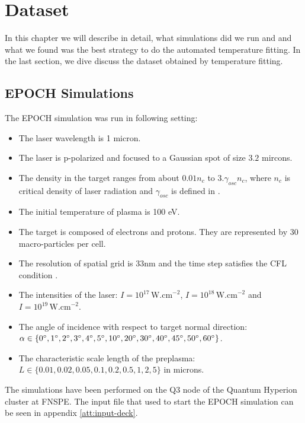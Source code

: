 \chapter{Dataset}
In this chapter we will describe in detail, what simulations did we run and and what we found was the best strategy to do the automated temperature fitting. In the last section, we dive discuss the dataset obtained by temperature fitting.
\section{EPOCH Simulations}
The EPOCH simulation was run in following setting:
\begin{itemize}
	\item The laser wavelength is 1 micron.
	\item The laser is p-polarized and focused to a Gaussian spot of size $3.2$ mircons.
	\item The density in the target ranges from about $0.01n_c$ to $3.\gamma_{osc}n_c$, where $n_c$ is critical density of laser radiation \cite{cui2013} and $\gamma_{osc}$ is defined in \cite{cui2013}.
	\item The initial temperature of plasma is 100 eV.
	\item The target is composed of electrons and protons. They are represented by 30 macro-particles per cell.
	\item The resolution of spatial grid is 33nm and the time step satisfies the CFL condition \cite{arber2015}.
	\item The intensities of the laser: $I=10^{17}\,\mathrm{W.cm}^{-2}$, $I=10^{18} \,\mathrm{W.cm}^{-2}$ and \newline$I=10^{19}\,\mathrm{W.cm}^{-2}$.
	\item The angle of incidence with respect to target normal direction: \newline $\alpha \in \{0\degree,1\degree,2\degree,3\degree,4\degree,5\degree,10\degree,20\degree,30\degree,40\degree,45\degree,50\degree,60\degree\}$.
	\item The characteristic scale length of the preplasma: \newline $L\in\{0.01,0.02,0.05,0.1,0.2,0.5,1,2,5\}$ in microns.
	
\end{itemize}
The simulations have been performed on the Q3 node of the Quantum Hyperion cluster at FNSPE. The input file that used to start the EPOCH simulation can be seen in appendix \ref{att:input-deck}.

